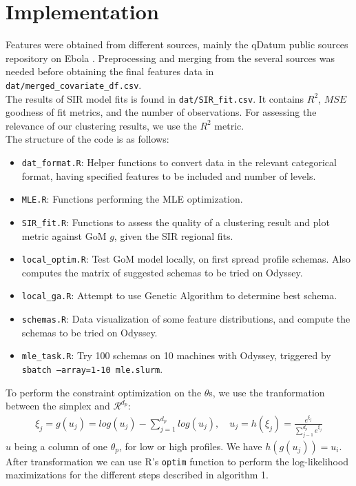 \documentclass[twoside]{article}
\begin{document}
\section{Implementation}

Features were obtained from different sources, mainly the qDatum public sources repository on Ebola \cite{source}. Preprocessing and merging from the several sources was needed before obtaining the final features data in \texttt{dat/merged\_covariate\_df.csv}.\\
\indent
The results of SIR model fits is found in \texttt{dat/SIR\_fit.csv}. It contains $R^2$, $MSE$ goodness of fit metrics, and the number of observations. For assessing the relevance of our clustering results, we use the $R^2$ metric.\\

The structure of the code is as follows:
\begin{itemize}
\item \texttt{dat\_format.R}: Helper functions to convert data in the relevant categorical format, having specified features to be included and number of levels.
\item \texttt{MLE.R}: Functions performing the MLE optimization.
\item \texttt{SIR\_fit.R}: Functions to assess the quality of a clustering result and plot metric against GoM $g$, given the SIR regional fits.
\item \texttt{local\_optim.R}: Test GoM model locally, on first spread profile schemas. Also computes the matrix of suggested schemas to be tried on Odyssey.
\item \texttt{local\_ga.R}: Attempt to use Genetic Algorithm to determine best schema.
\item \texttt{schemas.R}: Data visualization of some feature distributions, and compute the schemas to be tried on Odyssey.
\item \texttt{mle\_task.R}: Try 100 schemas on 10 machines with Odyssey, triggered by \texttt{sbatch --array=1-10 mle.slurm}.
\end{itemize}

To perform the constraint optimization on the $\theta$s, we use the tranformation between the simplex and $\mathcal{R}^{d_p}$:
\begin{align*}
\xi_j = g(u_j) = log(u_j) - \sum_{j=1}^{d_p} log(u_j), \quad u_j = h(\xi_j) = \frac{e^{\xi_j}}{\sum_{j-1}^{d_p} e^{\xi_j}}
\end{align*}
$u$ being a column of one $\theta_p$, for low or high profiles. We have $h(g(u_j)) = u_i$. After transformation we can use R's \texttt{optim} function to perform the log-likelihood maximizations for the different steps described in algorithm 1.\\
\end{document}
